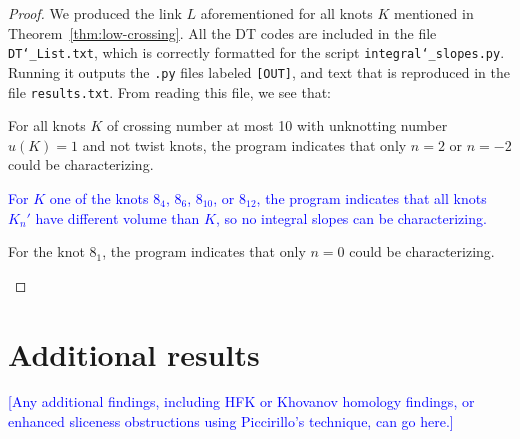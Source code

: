 \documentclass[11pt,usenames,dvipsnames,reqno]{amsart}
\numberwithin{theorem}{section}
\theoremstyle{ex}
\theoremstyle{rem}
\def\kh#1{\textcolor{Blue}{#1}}
\begin{document}
\begin{proof} We produced the link $L$ aforementioned for all knots $K$ mentioned in Theorem~\ref{thm:low-crossing}. All the DT codes are included in the file \texttt{DT\char`_List.txt}, which is correctly formatted for the script \texttt{integral\char`_slopes.py}. Running it outputs the \texttt{.py} files labeled \texttt{[OUT]}, and text that is reproduced in the file \texttt{results.txt}. From reading this file, we see that:
	\begin{enumerate}[label=\normalfont (\alph*)]
		\item For all knots $K$ of crossing number at most 10 with unknotting number $u(K) = 1$ and not twist knots, the program indicates that only $n = 2$ or $n = -2$ could be characterizing.
		\kh{\item For $K$ one of the knots $8_4$, $8_6$, $8_{10}$, or $8_{12}$, the program indicates that all knots $K_{n}'$ have different volume than $K$, so no integral slopes can be characterizing.}
		\item For the knot $8_1$, the program indicates that only $n = 0$ could be characterizing.
	\end{enumerate}
\end{proof}

\section{Additional results}

\kh{[Any additional findings, including HFK or Khovanov homology findings, or enhanced sliceness obstructions using Piccirillo's technique, can go here.]}




\end{document}

